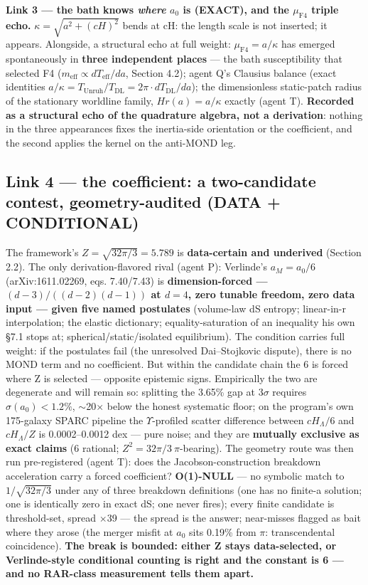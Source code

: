 \documentclass[11pt,a4paper]{article}
\begin{document}
\textbf{Link 3 --- the bath knows \emph{where} $a_{0}$ is (EXACT), and the $\mu_{\mathrm{F4}}$ triple echo.} $\kappa = \sqrt{a^2 + (cH)^2}$ bends at cH: the length scale is not inserted; it appears. Alongside, a structural echo at full weight: $\mu_{\mathrm{F4}} = a/\kappa$ has emerged spontaneously in \textbf{three independent places} --- the bath susceptibility that selected F4 ($m_{\mathrm{eff}} \propto dT_{\mathrm{eff}}/da$, Section 4.2); agent Q's Clausius balance (exact identities $a/\kappa = T_{\mathrm{Unruh}}/T_{\mathrm{DL}} = 2\pi\cdot dT_{\mathrm{DL}}/da$); the dimensionless static-patch radius of the stationary worldline family, $Hr(a) = a/\kappa$ exactly (agent T). \textbf{Recorded as a structural echo of the quadrature algebra, not a derivation}: nothing in the three appearances fixes the inertia-side orientation or the coefficient, and the second applies the kernel on the anti-MOND leg.

\subsection{Link 4 --- the coefficient: a two-candidate contest, geometry-audited (DATA + CONDITIONAL)}

The framework's $Z = \sqrt{32\pi/3} = 5.789$ is \textbf{data-certain and underived} (Section 2.2). The only derivation-flavored rival (agent P): Verlinde's $a_M = a_0/6$ (arXiv:1611.02269, eqs. 7.40/7.43) is \textbf{dimension-forced --- $(d-3)/((d-2)(d-1))$ at $d = 4$, zero tunable freedom, zero data input --- given five named postulates} (volume-law dS entropy; linear-in-r interpolation; the elastic dictionary; equality-saturation of an inequality his own \S{}7.1 stops at; spherical/static/isolated equilibrium). The condition carries full weight: if the postulates fail (the unresolved Dai--Stojkovic dispute), there is no MOND term and no coefficient. But within the candidate chain the 6 is forced where Z is selected --- opposite epistemic signs. Empirically the two are degenerate and will remain so: splitting the 3.65\% gap at $3\sigma$ requires $\sigma(a_0) < 1.2\%$, $\sim$20$\times$ below the honest systematic floor; on the program's own 175-galaxy SPARC pipeline the $\Upsilon$-profiled scatter difference between $cH_\Lambda/6$ and $cH_\Lambda/Z$ is 0.0002--0.0012 dex --- pure noise; and they are \textbf{mutually exclusive as exact claims} (6 rational; $Z^2 = 32\pi/3\ \pi$-bearing). The geometry route was then run pre-registered (agent T): does the Jacobson-construction breakdown acceleration carry a forced coefficient? \textbf{O(1)-NULL} --- no symbolic match to $1/\sqrt{32\pi/3}$ under any of three breakdown definitions (one has no finite-a solution; one is identically zero in exact dS; one never fires); every finite candidate is threshold-set, spread $\times$39 --- the spread is the answer; near-misses flagged as bait where they arose (the merger misfit at $a_{0}$ sits 0.19\% from $\pi$: transcendental coincidence). \textbf{The break is bounded: either Z stays data-selected, or Verlinde-style conditional counting is right and the constant is 6 --- and no RAR-class measurement tells them apart.}
\end{document}
